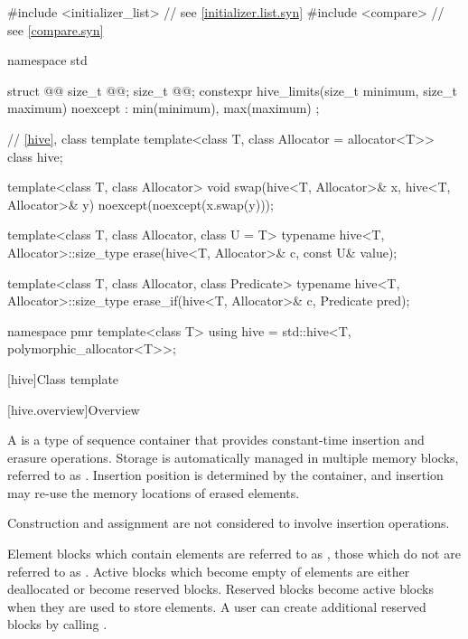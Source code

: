 %
\begin{codeblock}

#include <initializer_list>     // see \ref{initializer.list.syn}
#include <compare>              // see \ref{compare.syn}

namespace std {
  struct @@ {
    size_t @@;
    size_t @@;
    constexpr hive_limits(size_t minimum, size_t maximum) noexcept
      : min(minimum), max(maximum) {}
  };

  // \ref {hive}, class template 
  template<class T, class Allocator = allocator<T>> class hive;

  template<class T, class Allocator>
    void swap(hive<T, Allocator>& x, hive<T, Allocator>& y)
      noexcept(noexcept(x.swap(y)));

  template<class T, class Allocator, class U = T>
    typename hive<T, Allocator>::size_type
      erase(hive<T, Allocator>& c, const U& value);

  template<class T, class Allocator, class Predicate>
    typename hive<T, Allocator>::size_type
      erase_if(hive<T, Allocator>& c, Predicate pred);

  namespace pmr {
    template<class T>
      using hive = std::hive<T, polymorphic_allocator<T>>;
  }
}
\end{codeblock}

[hive]{Class template }

[hive.overview]{Overview}

\pnum
A  is a type of sequence container
that provides constant-time insertion and erasure operations.
Storage is automatically managed in multiple memory blocks,
referred to as .
Insertion position is determined by the container, and insertion
may re-use the memory locations of erased elements.
\begin{note}
Construction and assignment are not considered to involve insertion operations.
\end{note}

\pnum
Element blocks which contain elements are referred to
as ,
those which do not are referred to as .
Active blocks which become empty of elements are
either deallocated or become reserved blocks.
Reserved blocks become active blocks when they are used to store elements.
A user can create additional reserved blocks by calling .

